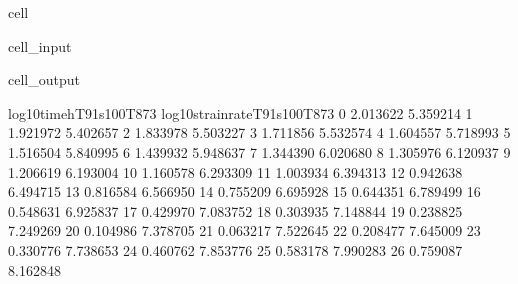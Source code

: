\documentclass[letterpaper,10pt,english]{jupyterBook}
\begin{document}
\begin{sphinxuseclass}{cell}
\begin{sphinxVerbatimInput}
\begin{sphinxuseclass}{cell_input}
		\end{sphinxuseclass}\end{sphinxVerbatimInput}
		\begin{sphinxVerbatimOutput}
			
			\begin{sphinxuseclass}{cell_output}
				\begin{sphinxVerbatim}[commandchars=\\\{\}]
					log10timeh\PYGZus{}T91s100T873  log10strainrate\PYGZus{}T91s100T873  \PYGZbs{}
					0                \PYGZhy{}2.013622                    \PYGZhy{}5.359214   
					1                \PYGZhy{}1.921972                    \PYGZhy{}5.402657   
					2                \PYGZhy{}1.833978                    \PYGZhy{}5.503227   
					3                \PYGZhy{}1.711856                    \PYGZhy{}5.532574   
					4                \PYGZhy{}1.604557                    \PYGZhy{}5.718993   
					5                \PYGZhy{}1.516504                    \PYGZhy{}5.840995   
					6                \PYGZhy{}1.439932                    \PYGZhy{}5.948637   
					7                \PYGZhy{}1.344390                    \PYGZhy{}6.020680   
					8                \PYGZhy{}1.305976                    \PYGZhy{}6.120937   
					9                \PYGZhy{}1.206619                    \PYGZhy{}6.193004   
					10               \PYGZhy{}1.160578                    \PYGZhy{}6.293309   
					11               \PYGZhy{}1.003934                    \PYGZhy{}6.394313   
					12               \PYGZhy{}0.942638                    \PYGZhy{}6.494715   
					13               \PYGZhy{}0.816584                    \PYGZhy{}6.566950   
					14               \PYGZhy{}0.755209                    \PYGZhy{}6.695928   
					15               \PYGZhy{}0.644351                    \PYGZhy{}6.789499   
					16               \PYGZhy{}0.548631                    \PYGZhy{}6.925837   
					17               \PYGZhy{}0.429970                    \PYGZhy{}7.083752   
					18               \PYGZhy{}0.303935                    \PYGZhy{}7.148844   
					19               \PYGZhy{}0.238825                    \PYGZhy{}7.249269   
					20               \PYGZhy{}0.104986                    \PYGZhy{}7.378705   
					21                0.063217                    \PYGZhy{}7.522645   
					22                0.208477                    \PYGZhy{}7.645009   
					23                0.330776                    \PYGZhy{}7.738653   
					24                0.460762                    \PYGZhy{}7.853776   
					25                0.583178                    \PYGZhy{}7.990283   
					26                0.759087                    \PYGZhy{}8.162848   

\end{sphinxVerbatim}
\end{sphinxuseclass}
\end{sphinxVerbatimOutput}
\end{sphinxuseclass}
\end{document}

